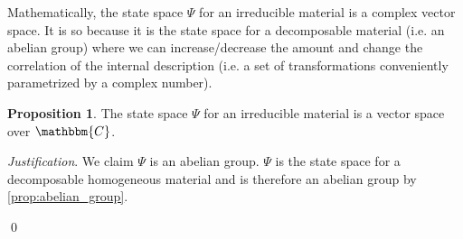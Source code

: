 \documentclass[aps,pra,10pt,twocolumn,floatfix,nofootinbib]{revtex4-1}
\numberwithin{equation}{section}
\theoremstyle{definition}
\newtheorem{prop}[equation]{Proposition}
\newenvironment{justification}{\emph{Justification}.}{\qed}
\begin{document}
Mathematically, the state space $\Psi$ for an irreducible material is a complex vector space. It is so because it is the state space for a decomposable material (i.e. an abelian group) where we can increase/decrease the amount and change the correlation of the internal description (i.e. a set of transformations conveniently parametrized by a complex number).

\begin{prop}\label{prop:complex_vector_space}
	The state space $\Psi$ for an irreducible material is a vector space over $\mathbbm{C}$.
\end{prop}

\begin{justification}
	We claim $\Psi$ is an abelian group. $\Psi$ is the state space for a decomposable homogeneous material and is therefore an abelian group  by \ref{prop:abelian_group}.
	

\end{justification}
\end{document}
